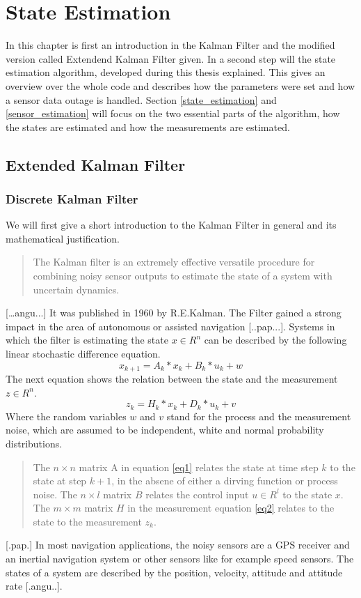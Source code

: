\chapter{State Estimation}\label{cha3}
In this chapter is first an introduction in the Kalman Filter and the modified version called Extendend Kalman Filter given. In a second step will the state estimation algorithm, developed during this thesis explained. This gives an overview over the whole code and describes how the parameters were set and how a sensor data outage is handled. Section \ref{state_estimation} and \ref{sensor_estimation} will focus on the two essential parts of the algorithm, how the states are estimated and how the measurements are estimated.
\section{Extended Kalman Filter}

\subsection*{Discrete Kalman Filter}
We will first give a short introduction to the Kalman Filter in general and its mathematical justification.
\begin{quote}The Kalman filter is an extremely effective versatile procedure for combining noisy sensor outputs to estimate the state of a system with uncertain dynamics.\end{quote} […angu...] It was published in 1960 by R.E.Kalman. The Filter gained a strong impact in the area of autonomous or assisted navigation [..pap...]. 
Systems in which the filter is estimating the state $x \in R^{n}$ can be described by the following linear stochastic difference equation.
\begin{equation}
x_{k+1}=A_k*x_k+B_k*u_k+w
\label{eq1}
\end{equation} The next equation shows the relation between the state and the measurement $z \in R^{n}$.
\begin{equation} 
z_k=H_k*x_k+D_k*u_k+v
\label{eq2}
\end{equation}
Where the random variables $w$ and $v$ stand for the process and the measurement noise, which are assumed to be independent, white and normal probability distributions.
\begin{quote}The $n\times n$ matrix A in equation \ref{eq1} relates the state at time step $k$ to the state at step $k+1$, in the absene of either a dirving function or process noise. The $n\times l$ matrix $B$ relates the control input $u \in R^{l}$ to the state $x$. The $m \times m$ matrix $H$ in the measurement equation \ref{eq2} relates to the state to the measurement $z_k$.\end{quote}[.pap.]
In most navigation applications, the noisy sensors are a GPS receiver and an inertial navigation system or other sensors like for example speed sensors. The states of a system are described by the position, velocity, attitude and attitude rate [.angu..].

